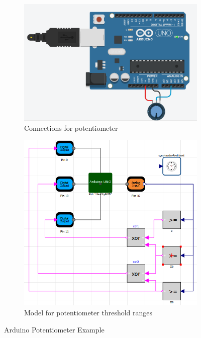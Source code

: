 \documentclass[12pt,a4paper]{report}
\begin{document}
\begin{figure}[H]
\begin{subfigure}{.5\textwidth}
\centering
\includegraphics[width =\linewidth]{5}
\caption{Connections for potentiometer}
\end{subfigure}
\begin{subfigure}{.5\textwidth}
\centering
\includegraphics[width =\linewidth]{potentio_ex1}
\caption{Model for potentiometer threshold ranges}
\end{subfigure}
\caption {Arduino Potentiometer Example}
\label{figure:18}
\end{figure}
\end{document}
